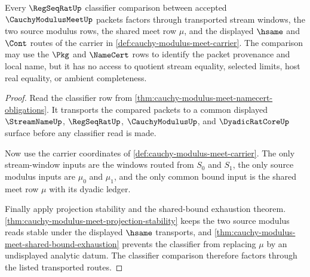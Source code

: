 \begin{theorem}\label{thm:cauchy-modulus-meet-regseqrat-classifier-transport}
Every $\RegSeqRatUp$ classifier comparison between accepted $\CauchyModulusMeetUp$ packets factors through transported stream windows, the two source modulus rows, the shared meet row $\mu$, and the displayed $\hsame$ and $\Cont$ routes of the carrier in \autoref{def:cauchy-modulus-meet-carrier}. The comparison may use the $\Pkg$ and $\NameCert$ rows to identify the packet provenance and local name, but it has no access to quotient stream equality, selected limits, host real equality, or ambient completeness.
\end{theorem}
\begin{proof}
Read the classifier row from \autoref{thm:cauchy-modulus-meet-namecert-obligations}. It transports the compared packets to a common displayed $\StreamNameUp$, $\RegSeqRatUp$, $\CauchyModulusUp$, and $\DyadicRatCoreUp$ surface before any classifier read is made.

Now use the carrier coordinates of \autoref{def:cauchy-modulus-meet-carrier}. The only stream-window inputs are the windows routed from $S_0$ and $S_1$, the only source modulus inputs are $\mu_0$ and $\mu_1$, and the only common bound input is the shared meet row $\mu$ with its dyadic ledger.

Finally apply projection stability and the shared-bound exhaustion theorem. \autoref{thm:cauchy-modulus-meet-projection-stability} keeps the two source modulus reads stable under the displayed $\hsame$ transports, and \autoref{thm:cauchy-modulus-meet-shared-bound-exhaustion} prevents the classifier from replacing $\mu$ by an undisplayed analytic datum. The classifier comparison therefore factors through the listed transported routes.
\end{proof}

